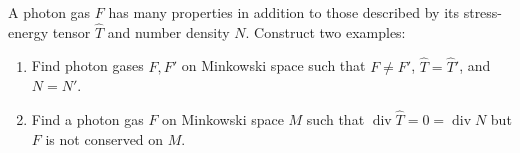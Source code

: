 A photon gas $F$ has many properties in addition to those described by its stress-energy tensor $\hat{T}$ and number density $N$. Construct two examples:

\begin{enumerate}
    \item[(a)] Find photon gases $F, F'$ on Minkowski space such that $F \neq F'$, $\hat{T} = \hat{T}'$, and $N = N'$.
    \item[(b)] Find a photon gas $F$ on Minkowski space $M$ such that $\operatorname{div} \hat{T} = 0 = \operatorname{div} N$ but $F$ is not conserved on $M$.
\end{enumerate}
